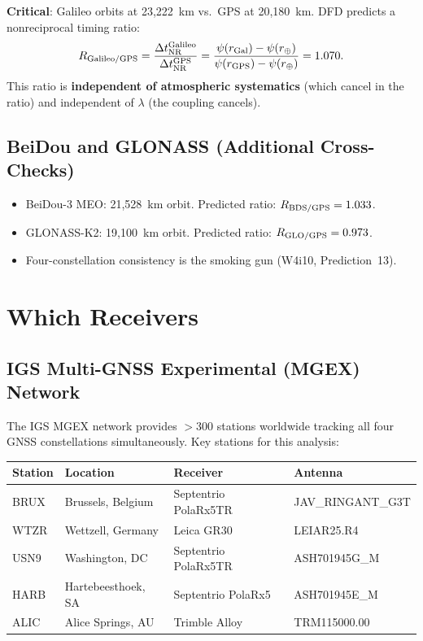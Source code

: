 \documentclass[11pt]{article}
\begin{document}
\textbf{Critical}: Galileo orbits at 23,222~km vs.\ GPS at 20,180~km.
DFD predicts a nonreciprocal timing ratio:
\begin{equation}
R_{\rm Galileo/GPS} = \frac{\Delta t_{\rm NR}^{\rm Galileo}}
{\Delta t_{\rm NR}^{\rm GPS}} = \frac{\psi(r_{\rm Gal}) - \psi(r_\oplus)}
{\psi(r_{\rm GPS}) - \psi(r_\oplus)} = 1.070.
\end{equation}
This ratio is \textbf{independent of atmospheric systematics} (which
cancel in the ratio) and independent of $\lambda$ (the coupling cancels).

\subsection{BeiDou and GLONASS (Additional Cross-Checks)}

\begin{itemize}[nosep]
\item BeiDou-3 MEO: 21,528~km orbit. Predicted ratio: $R_{\rm BDS/GPS} = 1.033$.
\item GLONASS-K2: 19,100~km orbit. Predicted ratio: $R_{\rm GLO/GPS} = 0.973$.
\item Four-constellation consistency is the smoking gun (W4i10, Prediction~13).
\end{itemize}

\section{Which Receivers}

\subsection{IGS Multi-GNSS Experimental (MGEX) Network}

The IGS MGEX network provides $>$300 stations worldwide tracking all
four GNSS constellations simultaneously. Key stations for this analysis:

\begin{center}
\renewcommand{\arraystretch}{1.2}
\begin{tabular}{@{}llll@{}}
\toprule
\textbf{Station} & \textbf{Location} & \textbf{Receiver} & \textbf{Antenna} \\
\midrule
BRUX & Brussels, Belgium & Septentrio PolaRx5TR & JAV\_RINGANT\_G3T \\
WTZR & Wettzell, Germany & Leica GR30 & LEIAR25.R4 \\
USN9 & Washington, DC & Septentrio PolaRx5TR & ASH701945G\_M \\
HARB & Hartebeesthoek, SA & Septentrio PolaRx5 & ASH701945E\_M \\
ALIC & Alice Springs, AU & Trimble Alloy & TRM115000.00 \\
\bottomrule
\end{tabular}
\end{center}
\end{document}
